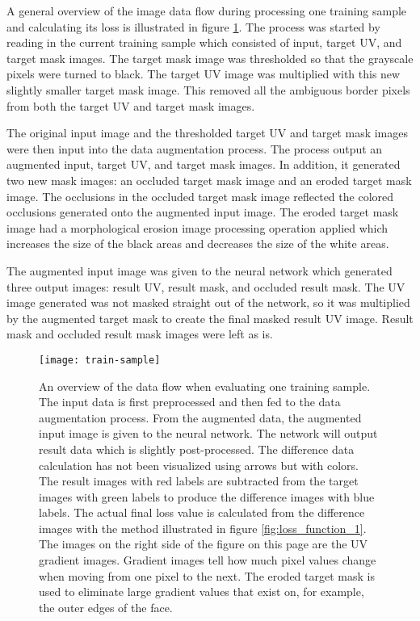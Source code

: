A general overview of the image data flow during processing one training sample and calculating its loss is illustrated in figure \ref{fig:train_sample_1}. The process was started by reading in the current training sample which consisted of input, target UV, and target mask images. The target mask image was thresholded so that the grayscale pixels were turned to black. The target UV image was multiplied with this new slightly smaller target mask image. This removed all the ambiguous border pixels from both the target UV and target mask images.

The original input image and the thresholded target UV and target mask images were then input into the data augmentation process. The process output an augmented input, target UV, and target mask images. In addition, it generated two new mask images: an occluded target mask image and an eroded target mask image. The occlusions in the occluded target mask image reflected the colored occlusions generated onto the augmented input image. The eroded target mask image had a morphological erosion image processing operation applied which increases the size of the black areas and decreases the size of the white areas.

The augmented input image was given to the neural network which generated three output images: result UV, result mask, and occluded result mask. The UV image generated was not masked straight out of the network, so it was multiplied by the augmented target mask to create the final masked result UV image. Result mask and occluded result mask images were left as is.

\begin{figure}
    \texttt{[image: train-sample]}
    \caption[Training sample]{An overview of the data flow when evaluating one training sample. The input data is first preprocessed and then fed to the data augmentation process. From the augmented data, the augmented input image is given to the neural network. The network will output result data which is slightly post-processed. The difference data calculation has not been visualized using arrows but with colors. The result images with red labels are subtracted from the target images with green labels to produce the difference images with blue labels. The actual final loss value is calculated from the difference images with the method illustrated in figure \ref{fig:loss_function_1}. The images on the right side of the figure on this page are the UV gradient images. Gradient images tell how much pixel values change when moving from one pixel to the next. The eroded target mask is used to eliminate large gradient values that exist on, for example, the outer edges of the face.}
    \label{fig:train_sample_1}
\end{figure}

